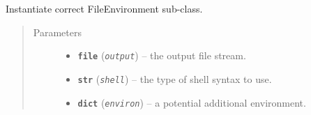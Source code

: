 \documentclass[a4paper,10pt,english]{sphinxmanual}
\begin{document}
\begin{fulllineitems}
\begin{fulllineitems}
\label{commands/apidoc/src:src.fileEnviron.ScreenEnviron.set}
\end{fulllineitems}


\begin{fulllineitems}
\label{commands/apidoc/src:src.fileEnviron.ScreenEnviron.write}
\end{fulllineitems}


\end{fulllineitems}


\begin{fulllineitems}
\label{commands/apidoc/src:src.fileEnviron.get_file_environ}
Instantiate correct FileEnvironment sub-class.
\begin{quote}\begin{description}
\item[{Parameters}] \leavevmode\begin{itemize}
\item {} 
\textbf{\texttt{file}} (\emph{\texttt{output}}) -- the output file stream.

\item {} 
\textbf{\texttt{str}} (\emph{\texttt{shell}}) -- the type of shell syntax to use.

\item {} 
\textbf{\texttt{dict}} (\emph{\texttt{environ}}) -- a potential additional environment.

\end{itemize}

\end{description}\end{quote}

\end{fulllineitems}

\end{document}
